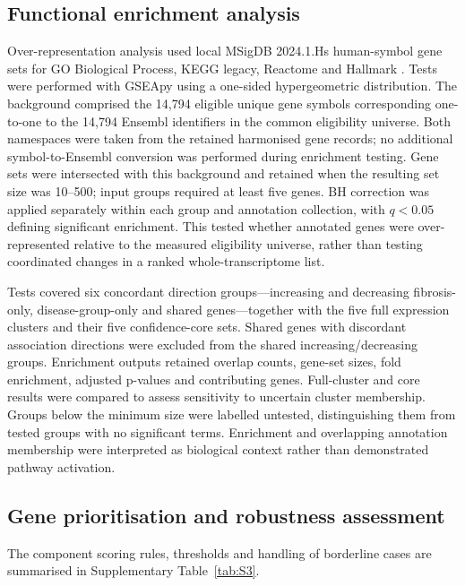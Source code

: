 \documentclass[11pt,a4paper]{article}
\begin{document}
\subsection*{Functional enrichment analysis}
Over-representation analysis used local MSigDB 2024.1.Hs human-symbol gene sets for GO Biological Process, KEGG legacy, Reactome and Hallmark \cite{ref12}. Tests were performed with GSEApy \cite{ref13} using a one-sided hypergeometric distribution. The background comprised the 14,794 eligible unique gene symbols corresponding one-to-one to the 14,794 Ensembl identifiers in the common eligibility universe. Both namespaces were taken from the retained harmonised gene records; no additional symbol-to-Ensembl conversion was performed during enrichment testing. Gene sets were intersected with this background and retained when the resulting set size was 10--500; input groups required at least five genes. BH correction was applied separately within each group and annotation collection, with \(q<0.05\) defining significant enrichment. This tested whether annotated genes were over-represented relative to the measured eligibility universe, rather than testing coordinated changes in a ranked whole-transcriptome list.

Tests covered six concordant direction groups---increasing and decreasing fibrosis-only, disease-group-only and shared genes---together with the five full expression clusters and their five confidence-core sets. Shared genes with discordant association directions were excluded from the shared increasing/decreasing groups. Enrichment outputs retained overlap counts, gene-set sizes, fold enrichment, adjusted p-values and contributing genes. Full-cluster and core results were compared to assess sensitivity to uncertain cluster membership. Groups below the minimum size were labelled untested, distinguishing them from tested groups with no significant terms. Enrichment and overlapping annotation membership were interpreted as biological context rather than demonstrated pathway activation.

\subsection*{Gene prioritisation and robustness assessment}
The component scoring rules, thresholds and handling of borderline cases are summarised in Supplementary Table~\ref{tab:S3}.
\end{document}
